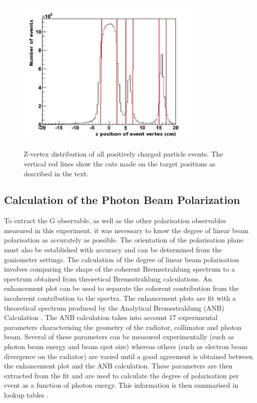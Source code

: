 \begin{figure}[htb]
  \includegraphics[width=0.8\textwidth]{figures/targets_pos.png} \\
  \caption{Z-vertex distribution of all positively charged particle events. The vertical red lines show the cuts made on the target positions as described in the text.}
  \label{fig:target_pos}
\end{figure}



\subsection{Calculation of the Photon Beam Polarization}
To extract the G observable, as well as the other polarisation observables measured in this experiment, it was necessary to know the degree of linear beam polarisation as accurately as possible. The orientation of the polarisation plane must also be established with accuracy and can be determined from the goniometer settings. The calculation of the degree of linear beam polarisation involves comparing the shape of the coherent Bremsstrahlung spectrum to a spectrum obtained from theoretical Bremsstrahlung calculations. An enhancement plot can be used to separate the coherent contribution from the incoherent contribution to the spectra. The enhancement plots are fit with a theoretical spectrum produced by the Analytical Bremsstrahlung (ANB) Calculation \cite{Natter_2003}\cite{Sabin_2010}. The ANB calculation takes into account 17 experimental parameters characterising the geometry of the radiator, collimator and photon beam. Several of these parameters can be measured experimentally (such as photon beam energy and beam spot size) whereas others (such as electron beam divergence on the radiator) are varied until a good agreement is obtained between the enhancement plot and the ANB calculation. These parameters are then extracted from the fit and are used to calculate the degree of polarisation per event as a function of photon energy. This information is then summarised in lookup tables \cite{Anderson_table}.

